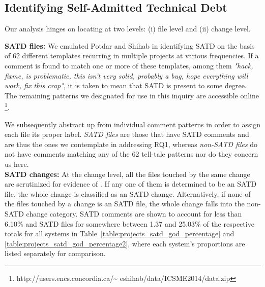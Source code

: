 \subsection{Identifying Self-Admitted Technical Debt}
\label{ch4_td}


Our analysis hinges on locating \SATD at two levels: (i) file level and (ii) change level.

\noindent\textbf{SATD files:}
We emulated Potdar and Shihab \cite{ICSM_PotdarS14} in identifying SATD on the basis of 62 different templates recurring in multiple projects at various frequencies. If a comment is found to match one or more of these templates, among them \textit{"hack, fixme, is problematic, this isn't very solid, probably a bug, hope everything will work, fix this crap"}, it is taken to mean that SATD is present to some degree. The remaining patterns we designated for use in this inquiry are accessible online \footnote{http://users.encs.concordia.ca/\textasciitilde
eshihab/data/ICSME2014/data.zip}.


We subsequently abstract up from individual comment patterns in order to assign each file its proper label. {\em SATD files} are those that have SATD comments and are thus the ones we contemplate in addressing RQ1, whereas {\em non-SATD files} do not have comments matching any of the 62 tell-tale patterns nor do they concern us here.\\


\noindent\textbf{SATD changes:}
At the change level, all the files touched by the same change are scrutinized for evidence of \SATD. If any one of them is determined to be an SATD file, the whole change is classified as an SATD change. Alternatively, if none of the files touched by a change is an SATD file, the whole change falls into the non-SATD change category. SATD comments are shown to account for less than 6.10\% and SATD files for somewhere between 1.37 and 25.03\% of the respective totals for all systems in Table~\ref{table:projects_satd_god_percentage} and \ref{table:projects_satd_god_percentage2}, where each system's proportions are listed separately for comparison.

